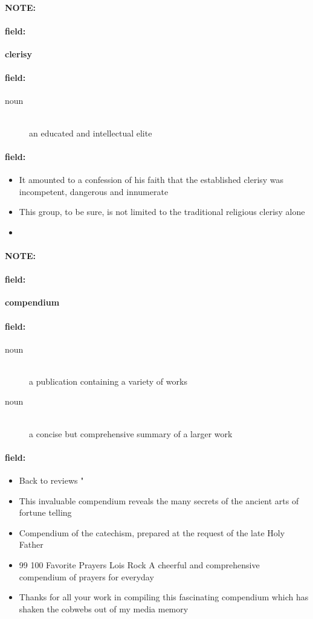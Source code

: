 \documentclass[12pt]{article}
\newenvironment{note}{\paragraph{NOTE:}}{}
\newenvironment{field}{\paragraph{field:}}{}
\begin{document}
\begin{note}
\begin{field}
\textbf{\large clerisy}
\end{field}


\begin{field}
\begin{description}
\item[noun] \hfill \\ 
an educated and intellectual elite

\end{description}
\end{field}

\begin{field}
\begin{itemize}
\item It amounted to a confession of his faith that the established clerisy was incompetent, dangerous and innumerate
\item This group, to be sure, is not limited to the traditional religious clerisy alone
\item 
\end{itemize}
\end{field}
\end{note}
\begin{note}
\begin{field}
\textbf{\large compendium}
\end{field}


\begin{field}
\begin{description}
\item[noun] \hfill \\ 
a publication containing a variety of works

\item[noun] \hfill \\ 
a concise but comprehensive summary of a larger work

\end{description}
\end{field}

\begin{field}
\begin{itemize}
\item Back to reviews " 
\item This invaluable compendium reveals the many secrets of the ancient arts of fortune telling
\item Compendium of the catechism, prepared at the request of the late Holy Father
\item 99 100 Favorite Prayers Lois Rock A cheerful and comprehensive compendium of prayers for everyday
\item Thanks for all your work in compiling this fascinating compendium which has shaken the cobwebs out of my media memory
\end{itemize}
\end{field}
\end{note}
\end{document}
